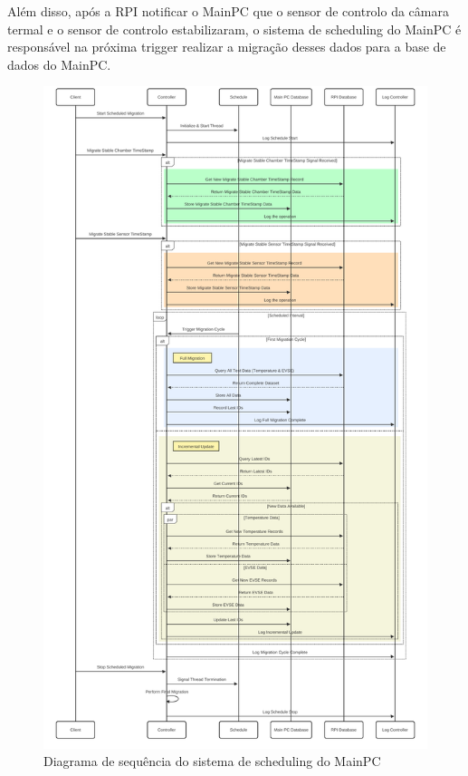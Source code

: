 Além disso, após a RPI notificar o MainPC que o sensor de controlo da câmara termal e o sensor de controlo estabilizaram, o sistema
de scheduling do MainPC é responsável na próxima trigger realizar a migração desses dados para a base de dados do MainPC.

\begin{figure}[H]
    \centering
    \includegraphics[scale=0.10]{figures/scheduling_1.pdf}
    \caption{Diagrama de sequência do sistema de scheduling do MainPC}
    \label{fig:scheduling_1}
\end{figure}

